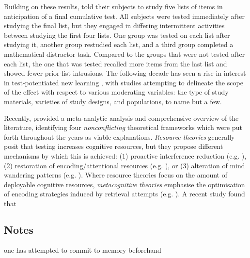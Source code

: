\documentclass[../main.tex]{subfiles}
\begin{document}
Building on these results, \cite{szpunarTestingStudyInsulates2008} told their subjects to study five lists of items in anticipation of a final cumulative test. All subjects were tested immediately after studying the final list, but they engaged in differing intermittent activities between studying the first four lists. One group was tested on each list after studying it, another group restudied each list, and a third group completed a mathematical distractor task. Compared to the groups that were not tested after each list, the one that was tested recalled more items from the last list and showed fewer prior-list intrusions. The following decade has seen a rise in interest in test-potentiated new learning \citep{chanRetrievalPotentiatesNew2018, pastotterRetrievalPracticeEnhances2014, yangEnhancingLearningRetrieval2018}, with studies attempting to delineate the scope of the effect with respect to various moderating variables: the type of study materials, varieties of study designs, and populations, to name but a few. 

Recently, \cite{chanRetrievalPotentiatesNew2018} provided a meta-analytic analysis and comprehensive overview of the literature, identifying four \textit{nonconflicting} theoretical frameworks which were put forth throughout the years as viable explanations. \textit{Resource theories} generally posit that testing increases cognitive resources, but they propose different mechanisms by which this is achieved: (1) proactive interference reduction (e.g. \citealp{wahlheimTestingCanCounteract2015, weinsteinTestingProtectsProactive2011, szpunarTestingStudyInsulates2008, nunesTestingImprovesTrue2012}), (2) restoration of encoding/attentional resources (e.g. \citealp{pastotterRetrievalLearningFacilitates2011}), or (3) alteration of mind wandering patterns (e.g. \citealp{jingInterpolatedTestingInfluences2016,szpunarInterpolatedMemoryTests2013,szpunarMindWanderingEducation2013}). Where resource theories focus on the amount of deployable cognitive resources, \textit{metacognitive theories} emphasise the optimisation of encoding strategies induced by retrieval attempts (e.g. \citealp{choTestingEnhancesBoth2017, chanTestingPotentiatesNew2018}). A recent study \citep{chanTestingPotentiatesNew2018} found that 


{
    \biblio
}

\subsection{Notes}
one has attempted to commit to memory beforehand
\end{document}
